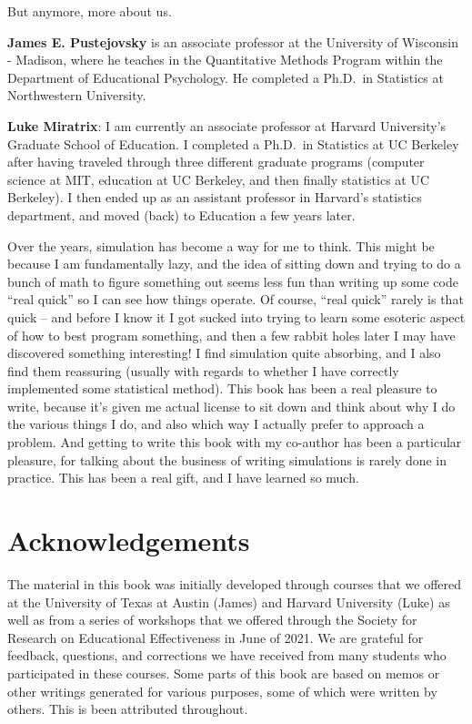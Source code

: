 \documentclass[
]{book}
\begin{document}
But anymore, more about us.

\textbf{James E. Pustejovsky} is an associate professor at the University of Wisconsin - Madison, where he teaches in the Quantitative Methods Program within the Department of Educational Psychology. He completed a Ph.D.~in Statistics at Northwestern University.

\textbf{Luke Miratrix}: I am currently an associate professor at Harvard University's Graduate School of Education. I completed a Ph.D.~in Statistics at UC Berkeley after having traveled through three different graduate programs (computer science at MIT, education at UC Berkeley, and then finally statistics at UC Berkeley).
I then ended up as an assistant professor in Harvard's statistics department, and moved (back) to Education a few years later.

Over the years, simulation has become a way for me to think.
This might be because I am fundamentally lazy, and the idea of sitting down and trying to do a bunch of math to figure something out seems less fun than writing up some code ``real quick'' so I can see how things operate. Of course, ``real quick'' rarely is that quick -- and before I know it I got sucked into trying to learn some esoteric aspect of how to best program something, and then a few rabbit holes later I may have discovered something interesting! I find simulation quite absorbing, and I also find them reassuring (usually with regards to whether I have correctly implemented some statistical method). This book has been a real pleasure to write, because it's given me actual license to sit down and think about why I do the various things I do, and also which way I actually prefer to approach a problem. And getting to write this book with my co-author has been a particular pleasure, for talking about the business of writing simulations is rarely done in practice. This has been a real gift, and I have learned so much.

\section*{Acknowledgements}\label{acknowledgements}

The material in this book was initially developed through courses that we offered at the University of Texas at Austin (James) and Harvard University (Luke) as well as from a series of workshops that we offered through the Society for Research on Educational Effectiveness in June of 2021. We are grateful for feedback, questions, and corrections we have received from many students who participated in these courses. Some parts of this book are based on memos or other writings generated for various purposes, some of which were written by others. This is been attributed throughout.
\end{document}
